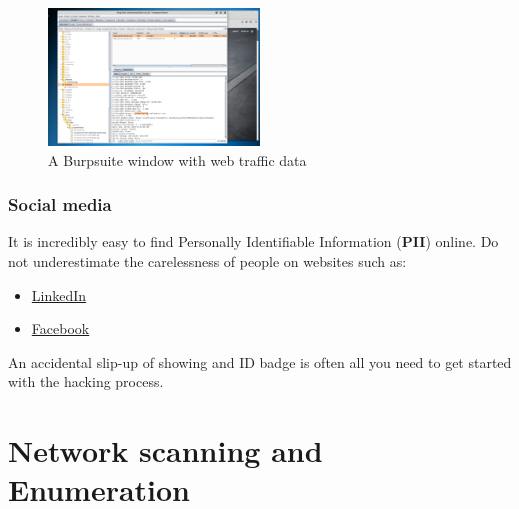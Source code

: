 \documentclass[a4paper,11pt]{article}
\begin{document}
\begin{figure}[h]
    \centering
    \includegraphics[width=0.5\textwidth]{images/burpsample.png}
    \caption{A Burpsuite window with web traffic data}
    \label{fig:burpsample}
\end{figure}
\pagebreak

\subsubsection{Social media}
It is incredibly easy to find Personally Identifiable Information ({\bfseries PII})
online. Do not underestimate the carelessness of people on websites such as:
\begin{itemize}
    \item \href{https://www.linkedin.com/}{LinkedIn}
    \item \href{https://www.facebook.com/}{Facebook}
\end{itemize}
An accidental slip-up of showing and ID badge is often all you need to get started with the hacking process.


\section{Network scanning and Enumeration}
\end{document}
